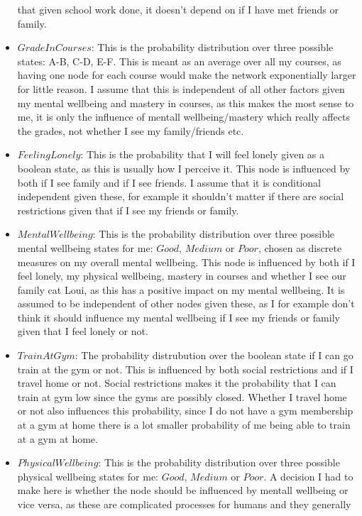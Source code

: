 \documentclass[11pt, a4paper, english]{../Template/NTNUoving}
\begin{document}
\begin{oppgave}
\begin{itemize}
        that given school work done, it doesn't depend on if I have met friends or family.
        \item $GradeInCourses$: This is the probability distribution over three possible states: A-B, C-D, E-F. This is meant as an average over all my courses, as having one node for each course would make the network exponentially larger for little reason. I assume that this is independent of all other factors given my mental wellbeing and mastery in courses,
        as this makes the most sense to me, it is only the influence of mentall wellbeing/mastery which really affects the grades, not whether I see my family/friends etc.
        \item $FeelingLonely$: This is the probability that I will feel lonely given as a boolean state, as this is usually how I perceive it. This node is influenced by both if I see family and if I see friends. I assume that it is conditional independent given these, for example it shouldn't matter
        if there are social restrictions given that if I see my friends or family.
        \item $MentalWellbeing$: This is the probability distribution over three possible mental wellbeing states for me: $Good$, $Medium$ or $Poor$, chosen as discrete measures on my overall mental wellbeing. This node is influenced by
        both if I feel lonely, my physical wellbeing, mastery in courses and whether I see our family cat Loui, as this has a positive impact on my mental wellbeing. It is assumed to be independent of other nodes given these, as I for example don't think it should influence my mental wellbeing if I see my friends or family
        given that I feel lonely or not.
        \item $TrainAtGym$: The probability distrubution over the boolean state if I can go train at the gym or not. This is influenced
        by both social restrictions and if I travel home or not. Social restrictions makes it the probability that I can train at gym low since the gyms are possibly closed.
        Whether I travel home or not also influences this probability, since I do not have a gym membership at a gym at home there is a lot smaller probability of me being able to
        train at a gym at home.
        \item $PhysicalWellbeing$: This is the probability distribution over three possible physical wellbeing states for me: $Good$, $Medium$ or $Poor$.
        A decision I had to make here is whether the node should be influenced by mentall wellbeing or vice versa, as these are complicated processes for humans and they generally

\end{itemize}
\end{oppgave}
\end{document}
